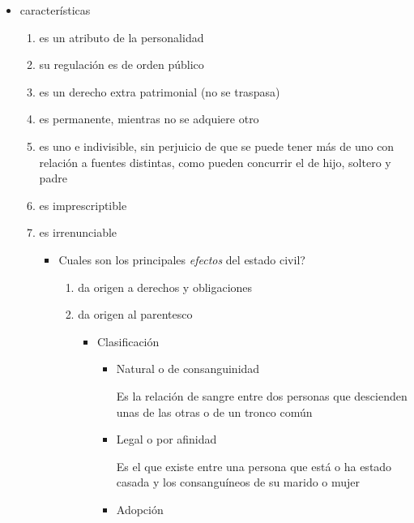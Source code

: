 \documentclass[]{article}
\providecommand{\tightlist}{%
  \setlength{\itemsep}{0pt}\setlength{\parskip}{0pt}}
\begin{document}
\begin{itemize}
\begin{itemize}
\begin{enumerate}
      \begin{itemize}
      \tightlist
      \item
        características

        \begin{enumerate}
        \def\labelenumii{\arabic{enumii}.}
        \tightlist
        \item
          es un atributo de la personalidad
        \item
          su regulación es de orden público
        \item
          es un derecho extra patrimonial (no se traspasa)
        \item
          es permanente, mientras no se adquiere otro
        \item
          es uno e indivisible, sin perjuicio de que se puede tener más
          de uno con relación a fuentes distintas, como pueden concurrir
          el de hijo, soltero y padre
        \item
          es imprescriptible
        \item
          es irrenunciable

          \begin{itemize}
          \item
            Cuales son los principales \emph{efectos} del estado civil?

            \begin{enumerate}
            \def\labelenumiii{\arabic{enumiii}.}
            \tightlist
            \item
              da origen a derechos y obligaciones
            \item
              da origen al parentesco

              \begin{itemize}
              \tightlist
              \item
                Clasificación

                \begin{itemize}
                \item
                  Natural o de consanguinidad

                  Es la relación de sangre entre dos personas que
                  descienden unas de las otras o de un tronco común
                \item
                  Legal o por afinidad

                  Es el que existe entre una persona que está o ha
                  estado casada y los consanguíneos de su marido o mujer
                \item
                  Adopción


\end{itemize}
\end{itemize}
\end{enumerate}
\end{itemize}
\end{enumerate}
\end{itemize}
\end{enumerate}
\end{itemize}
\end{itemize}
\end{document}
